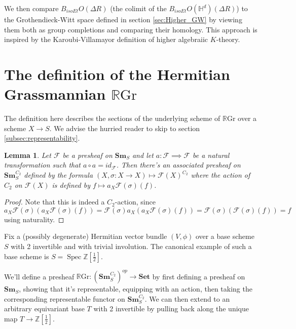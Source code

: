 \documentclass[edeposit,fullpage]{uiucthesis2009}
\newcommand{\Z}{\mathbb Z}
\newcommand{\mbb}{\mathbb}
\newcommand{\mc}{\mathcal}
\newcommand{\RGr}{\mathbb R\mathrm{Gr}}
\newcommand{\Set}{\mathbf{Set}}
\newcommand{\Sm}[1]{\mathbf{Sm}_{#1}}
\DeclareMathOperator{\Spec}{Spec}
\theoremstyle{plain}
\newtheorem{lemma}{Lemma}
\numberwithin{lemma}{section}
\theoremstyle{definition}
\begin{document}
We then compare $B_{isoEt}O(\Delta R)$ (the colimit of the
$B_{isoEt}O(\mbb H^d)(\Delta R)$) to
the Grothendieck-Witt space defined in section \ref{sec:Higher_GW} by viewing them both as group completions
and comparing their homology. This approach is inspired by the
Karoubi-Villamayor definition of higher algebraiic $K$-theory. 

\section{The definition of the Hermitian Grassmannian $\RGr$}

The definition here describes the sections of the underlying scheme of
$\RGr$ over a scheme $X \rightarrow S$. We advise the hurried reader to
skip to section \ref{subsec:representability}.

\begin{lemma}\label{lem:action_presheaf}
Let $\mc F$ be a presheaf on $\Sm{S}$ and let $a : \mc F \implies
\mc F$ be a natural transformation such that $a \circ a = id_{\mc F}$. Then
there's an associated presheaf on $\Sm{S}^{C_2}$ defined by the formula
$(X,\sigma : X \rightarrow X) \mapsto \mc F(X)^{C_2}$ where the action
of $C_2$ on $\mc F(X)$ is defined by $f \mapsto  a_X\mc F(\sigma)(f)$.
\end{lemma}

\begin{proof}
Note that this is indeed a $C_2$-action, since $a_X \mc F(\sigma)(
a_X\mc F(\sigma)(f)) = \mc F(\sigma) a_X(a_X \mc F(\sigma)(f)) = \mc
F(\sigma)(\mc F(\sigma)(f)) = f$ using naturality. 
\end{proof}

Fix a (possibly degenerate) Hermitian vector bundle $(V,\phi)$ over a
base scheme $S$ with 2 invertible and with trivial
involution. The canonical example of such a base scheme is $S = \Spec \Z[\frac{1}{2}]$.

We'll define a presheaf $\RGr : (\Sm{S}^{C_2})^{op} \rightarrow \Set$
by first defining a presheaf on $\Sm{S}$, showing that it's
representable, equipping with an action, then taking the corresponding
representable functor on $\Sm{S}^{C_2}$. We can then extend to an
arbitrary equivariant base $T$ with 2 invertible by pulling back along the unique map $T
\rightarrow \Z[\frac{1}{2}]$.
\end{document}
